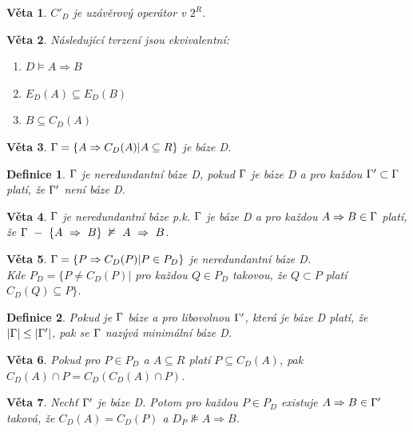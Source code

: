 \documentclass[10pt,a4paper]{article}
\newtheorem{veta}{Věta}
\newtheorem{definition}{Definice}
\begin{document}
\begin{veta}
$C'_D$ je uzávěrový operátor v $2^R$.
\end{veta}
\pagebreak
\begin{veta}
Následující tvrzení jsou ekvivalentní:
\begin{enumerate}[i]
\item $D \models A \Rightarrow B$
\item $E_D(A) \subseteq E_D(B)$
\item $B \subseteq C_D(A)$
\end{enumerate}
\end{veta}

\begin{veta}
$\Gamma = \{A \Rightarrow C_D(A) | A \subseteq R\}$ je báze D.
\end{veta}

\begin{definition}
$\Gamma$ je neredundantní báze D, pokud $\Gamma$ je báze D a pro každou $\Gamma' \subset \Gamma$ platí, že $\Gamma'$ není báze D.
\end{definition}

\begin{veta}
$\Gamma$ je neredundantní báze p.k. $\Gamma$ je báze D a pro každou $A \Rightarrow B \in \Gamma$ platí, že $\Gamma~-~\{A~\Rightarrow~B\}~\nvDash~A~\Rightarrow~B$.
\end{veta}

\begin{veta}
$\Gamma = \{P \Rightarrow C_D(P) | P \in P_D \}$ je neredundantní báze D.\\
Kde $P_D = \{P \neq C_D(P) | $ pro každou $ Q \in P_D $ takovou, že $ Q \subset P$ platí $C_D(Q) \subseteq P\}$.
\end{veta}

\begin{definition}
Pokud je $\Gamma$ báze a pro libovolnou $\Gamma'$, která je báze D platí, že $|\Gamma| \leq |\Gamma'|$, pak se $\Gamma$ nazývá minimální báze D.
\end{definition}

\begin{veta}
Pokud pro $P \in P_D$ a $A \subseteq R$ platí $P \subseteq C_D(A)$, pak $C_D(A)\cap P = C_D(C_D(A)\cap P)$.
\end{veta}

\begin{veta}
Nechť $\Gamma'$ je báze D. Potom pro každou $P \in P_D$ existuje $A \Rightarrow B \in \Gamma'$ taková, že $C_D(A) = C_D(P)$ a $D_P \nVDash A \Rightarrow B$.
\end{veta}
\end{document}
